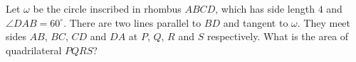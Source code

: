 Let $\omega$ be the circle inscribed in rhombus $ABCD$, which has side length $4$ and $\angle DAB=60^\circ$. There are two lines parallel to $BD$ and tangent to $\omega$. They meet sides $AB$, $BC$, $CD$ and $DA$ at $P$, $Q$, $R$ and $S$ respectively. What is the area of quadrilateral $PQRS$?
